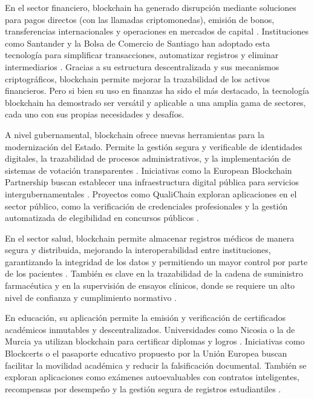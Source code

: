 En el sector financiero, blockchain ha generado disrupción mediante soluciones para pagos directos (con las llamadas criptomonedas), emisión de bonos, transferencias internacionales y operaciones en mercados de capital \cite{bartolomeo2020introduccion}. Instituciones como Santander y la Bolsa de Comercio de Santiago han adoptado esta tecnología para simplificar transacciones, automatizar registros y eliminar intermediarios \cite{bartolomeo2020introduccion}. Gracias a su estructura descentralizada y sus mecanismos criptográficos, blockchain permite mejorar la trazabilidad de los activos financieros. Pero si bien su uso en finanzas ha sido el más destacado, la tecnología blockchain ha demostrado ser versátil y aplicable a una amplia gama de sectores, cada uno con sus propias necesidades y desafíos.

A nivel gubernamental, blockchain ofrece nuevas herramientas para la modernización del Estado. Permite la gestión segura y verificable de identidades digitales, la trazabilidad de procesos administrativos, y la implementación de sistemas de votación transparentes \cite{vaigandla2023review}. Iniciativas como la European Blockchain Partnership buscan establecer una infraestructura digital pública para servicios intergubernamentales \cite{diez2023web}. Proyectos como QualiChain exploran aplicaciones en el sector público, como la verificación de credenciales profesionales y la gestión automatizada de elegibilidad en concursos públicos \cite{diez2023web}.

En el sector salud, blockchain permite almacenar registros médicos de manera segura y distribuida, mejorando la interoperabilidad entre instituciones, garantizando la integridad de los datos y permitiendo un mayor control por parte de los pacientes \cite{sunny2022systematic, }. También es clave en la trazabilidad de la cadena de suministro farmacéutica y en la supervisión de ensayos clínicos, donde se requiere un alto nivel de confianza y cumplimiento normativo \cite{vaigandla2023review}.

En educación, su aplicación permite la emisión y verificación de certificados académicos inmutables y descentralizados. Universidades como Nicosia o la de Murcia ya utilizan blockchain para certificar diplomas y logros \cite{diez2023web}. Iniciativas como Blockcerts o el pasaporte educativo propuesto por la Unión Europea buscan facilitar la movilidad académica y reducir la falsificación documental. También se exploran aplicaciones como exámenes autoevaluables con contratos inteligentes, recompensas por desempeño y la gestión segura de registros estudiantiles \cite{diez2023web}.

